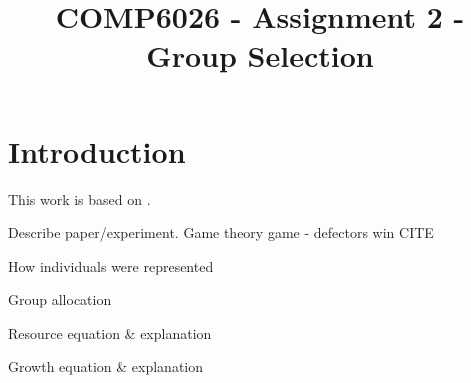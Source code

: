 \documentclass[11pt]{ecsarticle}
\title{COMP6026 - Assignment 2 - Group Selection}
\begin{document}
\maketitle
 
\section{Introduction}

This work is based on \cite{powers2007individual}.

Describe paper/experiment.
Game theory game - defectors win CITE


How individuals were represented

Group allocation

Resource equation \& explanation

Growth equation \& explanation
\end{document}
